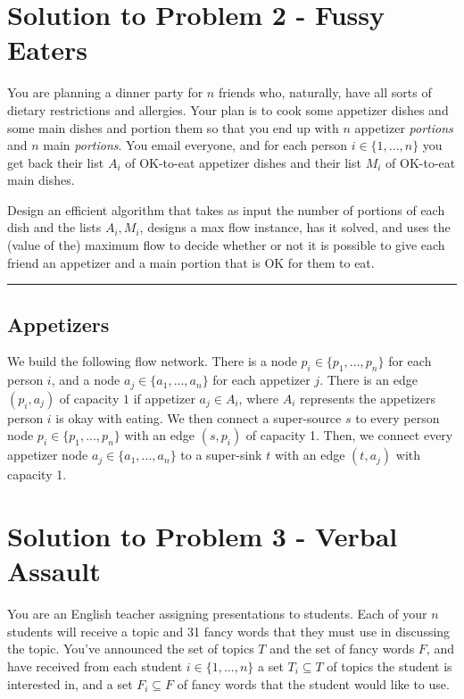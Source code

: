 \documentclass[11pt]{article}
\begin{document}
\section*{Solution to Problem 2 - Fussy Eaters}

You are planning a dinner party for $n$ friends who, naturally, have all sorts of dietary restrictions and allergies. Your plan is to cook some appetizer dishes and some main dishes and portion them so that you end up with $n$ appetizer \textit{portions} and $n$ main \textit{portions}. You email everyone, and for each person $i \in \{1, ... , n\}$ you get back their list $A_i$ of OK-to-eat appetizer dishes and their list $M_i$ of OK-to-eat main dishes.

Design an efficient algorithm that takes as input the number of portions of each dish and the lists $A_i, M_i$, designs a max flow instance, has it solved, and uses the (value of the) maximum flow to decide whether or not it is possible to give each friend an appetizer and a main portion that is OK for them to eat.

\noindent\rule{17cm}{0.4pt}
\subsection*{Appetizers}
We build the following flow network. There is a node $p_i \in \{p_1, ..., p_n\}$ for each person $i$, and a node $a_j \in \{a_1, ..., a_n\}$ for each appetizer $j$. There is an edge $(p_i, a_j)$ of capacity $1$ if appetizer $a_j \in A_i$, where $A_i$ represents the appetizers person $i$ is okay with eating. We then connect a super-source $s$ to every person node $p_i \in \{p_1, ..., p_n\}$ with an edge $(s, p_i)$ of capacity 1. Then, we connect every appetizer node $a_j \in \{a_1, ..., a_n\}$ to a super-sink $t$ with an edge $(t, a_j)$ with capacity 1.

\pagebreak

\section*{Solution to Problem 3 - Verbal Assault}

You are an English teacher assigning presentations to students. Each of your $n$ students will receive a topic and 31 fancy words that they must use in discussing the topic. You've announced the set of topics $T$ and the set of fancy words $F$, and have received from each student $i \in \{1, ..., n\}$ a set $T_i \subseteq T$ of topics the student is interested in, and a set $F_i \subseteq F$ of fancy words that the student would like to use.
\end{document}

